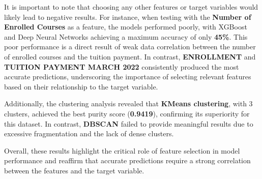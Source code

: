 \documentclass{article}
\begin{document}
It is important to note that choosing any other features or target variables would likely lead to negative results. For instance, when testing with the \textbf{Number of Enrolled Courses} as a feature, the models performed poorly, with XGBoost and Deep Neural Networks achieving a maximum accuracy of only \textbf{45\%}. This poor performance is a direct result of weak data correlation between the number of enrolled courses and the tuition payment. In contrast, \textbf{ENROLLMENT} and \textbf{TUITION PAYMENT MARCH 2022} consistently produced the most accurate predictions, underscoring the importance of selecting relevant features based on their relationship to the target variable.

Additionally, the clustering analysis revealed that \textbf{KMeans clustering}, with 3 clusters, achieved the best purity score (\textbf{0.9419}), confirming its superiority for this dataset. In contrast, \textbf{DBSCAN} failed to provide meaningful results due to excessive fragmentation and the lack of dense clusters.

Overall, these results highlight the critical role of feature selection in model performance and reaffirm that accurate predictions require a strong correlation between the features and the target variable.
\end{document}
